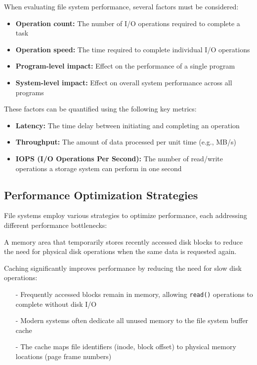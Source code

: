 \documentclass[../../compsys.tex]{subfiles}
\begin{document}
When evaluating file system performance, several factors must be considered:

\begin{itemize}
  \item \textbf{Operation count:} The number of I/O operations required to complete a task
  \item \textbf{Operation speed:} The time required to complete individual I/O operations
  \item \textbf{Program-level impact:} Effect on the performance of a single program
  \item \textbf{System-level impact:} Effect on overall system performance across all programs
\end{itemize}

These factors can be quantified using the following key metrics:

\begin{itemize}
  \item \textbf{Latency:} The time delay between initiating and completing an operation
  \item \textbf{Throughput:} The amount of data processed per unit time (e.g., MB/s)
  \item \textbf{IOPS (I/O Operations Per Second):} The number of read/write operations a storage system can perform in one second
\end{itemize}

\subsection{Performance Optimization Strategies}

File systems employ various strategies to optimize performance, each addressing different performance bottlenecks:

\begin{definition}
A memory area that temporarily stores recently accessed disk blocks to reduce the need for physical disk operations when the same data is requested again.
\end{definition}

Caching significantly improves performance by reducing the need for slow disk operations:
\begin{itemize}
  \item[-] Frequently accessed blocks remain in memory, allowing \texttt{read()} operations to complete without disk I/O
  \item[-] Modern systems often dedicate all unused memory to the file system buffer cache
  \item[-] The cache maps file identifiers (inode, block offset) to physical memory locations (page frame numbers)
\end{itemize}
\end{document}
